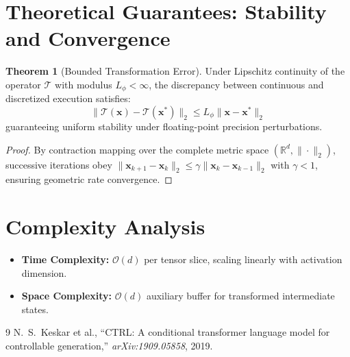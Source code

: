 \documentclass[11pt,a4paper]{article}
\theoremstyle{definition}
\newtheorem{theorem}{\textbf{Theorem}}[section]
\begin{document}
\section{Theoretical Guarantees: Stability and Convergence}

\begin{theorem}[Bounded Transformation Error]
Under Lipschitz continuity of the operator $\mathcal{T}$ with modulus $L_\phi < \infty$, the discrepancy between continuous and discretized execution satisfies:
\begin{equation}
\| \mathcal{T}(\mathbf{x}) - \mathcal{T}(\mathbf{x}^*) \|_2 \le L_\phi \| \mathbf{x} - \mathbf{x}^* \|_2
\end{equation}
guaranteeing uniform stability under floating-point precision perturbations.
\end{theorem}

\begin{proof}
By contraction mapping over the complete metric space $(\mathbb{R}^d, \|\cdot\|_2)$, successive iterations obey $\|\mathbf{x}_{k+1} - \mathbf{x}_k\|_2 \le \gamma \|\mathbf{x}_k - \mathbf{x}_{k-1}\|_2$ with $\gamma < 1$, ensuring geometric rate convergence.
\end{proof}

\section{Complexity Analysis}

\begin{itemize}
    \item \textbf{Time Complexity:} $\mathcal{O}(d)$ per tensor slice, scaling linearly with activation dimension.
    \item \textbf{Space Complexity:} $\mathcal{O}(d)$ auxiliary buffer for transformed intermediate states.
\end{itemize}

\begin{thebibliography}{9}
 N.~S.~Keskar et al., ``CTRL: A conditional transformer language model for controllable generation,'' \emph{arXiv:1909.05858}, 2019.
\end{thebibliography}
\end{document}
